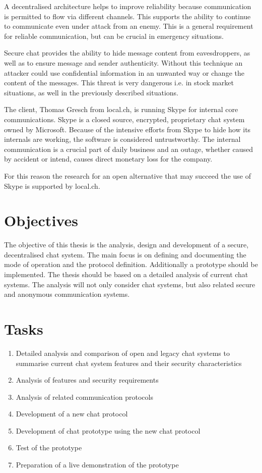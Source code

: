 A decentralised architecture helps to improve reliability because communication is
permitted to flow via different channels. This supports the ability to 
continue to communicate even under attack from an enemy. This is a general
requirement for reliable communication, but can be crucial in emergency situations.

Secure chat provides the ability to hide message content from eavesdroppers,
as well as to ensure message and sender authenticity.  Without this technique
an attacker could use confidential information in an unwanted way or change the
content of the messages. This threat is very dangerous i.e. in stock market 
situations, as well in the previously described situations.

The client, Thomas Gresch from local.ch, is running Skype for internal core 
communications. Skype is a closed source, encrypted, proprietary chat system 
owned by Microsoft. Because of the intensive efforts from Skype to hide how 
its internals are working, the software is considered untrustworthy.
The internal communication is a crucial part of daily business and an 
outage, whether caused by accident or intend, causes direct monetary 
loss for the company.

For this reason the research for an open alternative that may succeed 
the use of Skype is supported by local.ch.
\section{Objectives}
\label{objectives}
The objective of this thesis is the analysis, design and development of a secure, decentralised chat system. The main focus is on defining and documenting the mode of operation and the protocol definition. Additionally a prototype should be implemented. The thesis should be based on a detailed analysis of current chat systems. The analysis will not only consider chat systems, but also related secure and anonymous communication systems.
\section{Tasks}
\begin{enumerate}
\item Detailed analysis and comparison of open and legacy chat systems to summarise current chat system features and their security characteristics
\item Analysis of features and security requirements
\item Analysis of related communication protocols
\item Development of a new chat protocol
\item Development of chat prototype using the new chat protocol
\item Test of the prototype
\item Preparation of a live demonstration of the prototype
\end{enumerate}
